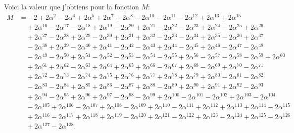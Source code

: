 \documentclass[11pt,a4paper]{book}
\begin{document}
Voici la valeur que j'obtiens pour la fonction $M$:
\begin{align*}
M &= -2 + 2\alpha^2 - 2\alpha^4 + 2\alpha^5 + 2\alpha^7 + 2\alpha^8 - 2\alpha^{10} - 2\alpha^{11} - 2\alpha^{12} + 2\alpha^{13} + 2\alpha^{15} \\
&\quad + 2\alpha^{16} - 2\alpha^{17} - 2\alpha^{18} + 2\alpha^{19} - 2\alpha^{20} + 2\alpha^{21} - 2\alpha^{22} - 2\alpha^{23} + 2\alpha^{24} - 2\alpha^{25} + 2\alpha^{26} \\
&\quad + 2\alpha^{27} - 2\alpha^{28} + 2\alpha^{29} - 2\alpha^{30} + 2\alpha^{31} + 2\alpha^{32} - 2\alpha^{33} - 2\alpha^{34} + 2\alpha^{35} - 2\alpha^{36} + 2\alpha^{37} \\
&\quad - 2\alpha^{38} + 2\alpha^{39} - 2\alpha^{40} + 2\alpha^{41} - 2\alpha^{42} - 2\alpha^{43} + 2\alpha^{44} - 2\alpha^{45} + 2\alpha^{46} - 2\alpha^{47} - 2\alpha^{48} \\
&\quad - 2\alpha^{49} - 2\alpha^{50} + 2\alpha^{51} - 2\alpha^{52} - 2\alpha^{53} - 2\alpha^{54} - 2\alpha^{55} + 2\alpha^{56} - 2\alpha^{57} - 2\alpha^{58} - 2\alpha^{59} + 2\alpha^{60} \\
&\quad + 2\alpha^{61} + 2\alpha^{62} - 2\alpha^{63} + 2\alpha^{64} + 2\alpha^{65} + 2\alpha^{66} - 2\alpha^{67} + 2\alpha^{68} - 2\alpha^{69} + 2\alpha^{70} - 2\alpha^{71} \\
&\quad + 2\alpha^{72} - 2\alpha^{73} - 2\alpha^{74} + 2\alpha^{75} + 2\alpha^{76} + 2\alpha^{77} + 2\alpha^{78} + 2\alpha^{79} + 2\alpha^{80} - 2\alpha^{81} - 2\alpha^{82} \\
&\quad - 2\alpha^{83} - 2\alpha^{84} + 2\alpha^{85} + 2\alpha^{86} - 2\alpha^{87} + 2\alpha^{88} - 2\alpha^{89} + 2\alpha^{90} + 2\alpha^{91} + 2\alpha^{92} - 2\alpha^{93} \\
&\quad + 2\alpha^{94} - 2\alpha^{95} + 2\alpha^{96} + 2\alpha^{97} - 2\alpha^{98} - 2\alpha^{99} + 2\alpha^{100} - 2\alpha^{101} - 2\alpha^{102} + 2\alpha^{103} - 2\alpha^{104} \\
&\quad - 2\alpha^{105} + 2\alpha^{106} - 2\alpha^{107} + 2\alpha^{108} - 2\alpha^{109} + 2\alpha^{110} - 2\alpha^{111} + 2\alpha^{112} + 2\alpha^{113} + 2\alpha^{114} - 2\alpha^{115} \\
&\quad + 2\alpha^{116} - 2\alpha^{117} + 2\alpha^{118} + 2\alpha^{119} - 2\alpha^{120} + 2\alpha^{121} - 2\alpha^{122} + 2\alpha^{123} - 2\alpha^{124} + 2\alpha^{125} - 2\alpha^{126} \\
&\quad + 2\alpha^{127} - 2\alpha^{128}.
\end{align*}
\end{document}
